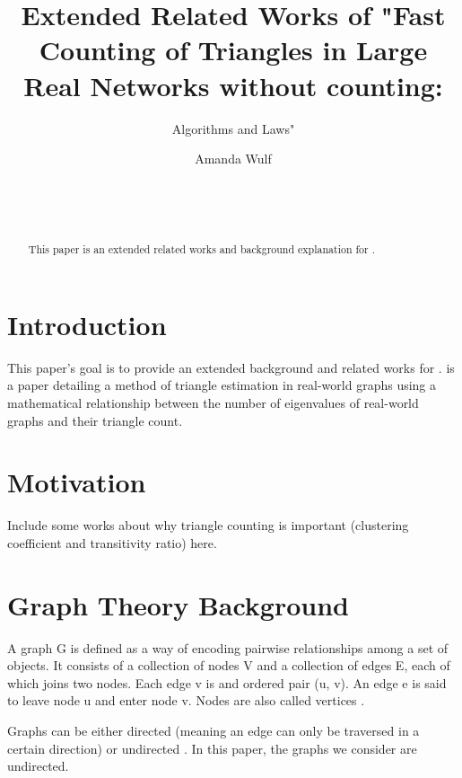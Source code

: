 \documentclass{acm_proc_article-sp}
\begin{document}
\title{Extended Related Works of "Fast Counting of Triangles in Large Real Networks without counting:}
\subtitle{Algorithms and Laws"}

\author{
\alignauthor
Amanda Wulf\\
       \\
       \\
       \\
}

\maketitle
\begin{abstract}
This paper is an extended related works and background explanation for
\cite{original}.
\end{abstract}

\section{Introduction}
This paper's goal is to provide an extended background and related works for
\cite{original}. \cite{original} is a paper detailing a method of triangle
estimation in real-world graphs using a mathematical relationship between the
number of eigenvalues of real-world graphs and their triangle count.

\section{Motivation}
Include some works about why triangle counting is important
(clustering coefficient and transitivity ratio) here.

\section{Graph Theory Background}
A graph G is defined as a way of encoding pairwise relationships among a set of
objects. It consists of a collection of nodes V and a collection of edges E, each
of which joins two nodes. Each edge v is and ordered pair (u, v). An edge e is
said to leave node u and enter node v. Nodes are also called vertices
\cite{kleinberg}.

Graphs can be either directed (meaning an edge can only be traversed in a
certain direction) or undirected \cite{kleinberg}. In this paper, the graphs we
consider are undirected.
\end{document}
